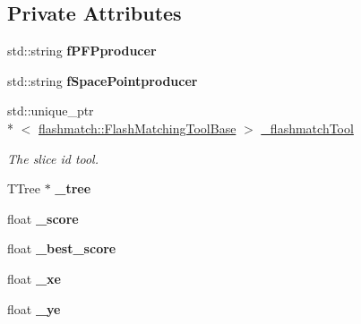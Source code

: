 \subsection*{Private Attributes}
\begin{DoxyCompactItemize}
\item 
\hypertarget{classCosmicRejection_a032c55a459e56180eb0041033fa3ef34}{std\-::string {\bfseries f\-P\-F\-Pproducer}}\label{classCosmicRejection_a032c55a459e56180eb0041033fa3ef34}

\item 
\hypertarget{classCosmicRejection_a8f638302d646f661ce8926cf5442783f}{std\-::string {\bfseries f\-Space\-Pointproducer}}\label{classCosmicRejection_a8f638302d646f661ce8926cf5442783f}

\item 
\hypertarget{classCosmicRejection_a89d060de9ac73f2847caf864c6eed691}{std\-::unique\-\_\-ptr\\*
$<$ \hyperlink{classflashmatch_1_1FlashMatchingToolBase}{flashmatch\-::\-Flash\-Matching\-Tool\-Base} $>$ \hyperlink{classCosmicRejection_a89d060de9ac73f2847caf864c6eed691}{\-\_\-flashmatch\-Tool}}\label{classCosmicRejection_a89d060de9ac73f2847caf864c6eed691}

\begin{DoxyCompactList}\small\item\em The slice id tool. \end{DoxyCompactList}\item 
\hypertarget{classCosmicRejection_a3c8cc182ac836bfe075b7ff7958dc691}{T\-Tree $\ast$ {\bfseries \-\_\-tree}}\label{classCosmicRejection_a3c8cc182ac836bfe075b7ff7958dc691}

\item 
\hypertarget{classCosmicRejection_a67ae851b53fcd9254bafa834368aacf9}{float {\bfseries \-\_\-score}}\label{classCosmicRejection_a67ae851b53fcd9254bafa834368aacf9}

\item 
\hypertarget{classCosmicRejection_a2a52872e6ac61b0948c0d6a27f49f827}{float {\bfseries \-\_\-best\-\_\-score}}\label{classCosmicRejection_a2a52872e6ac61b0948c0d6a27f49f827}

\item 
\hypertarget{classCosmicRejection_a33b7e7bb2de6fffbb340b9b061904dca}{float {\bfseries \-\_\-xe}}\label{classCosmicRejection_a33b7e7bb2de6fffbb340b9b061904dca}

\item 
\hypertarget{classCosmicRejection_ac33522cd488a11284d2c1041114842e2}{float {\bfseries \-\_\-ye}}\label{classCosmicRejection_ac33522cd488a11284d2c1041114842e2}


\end{DoxyCompactItemize}
